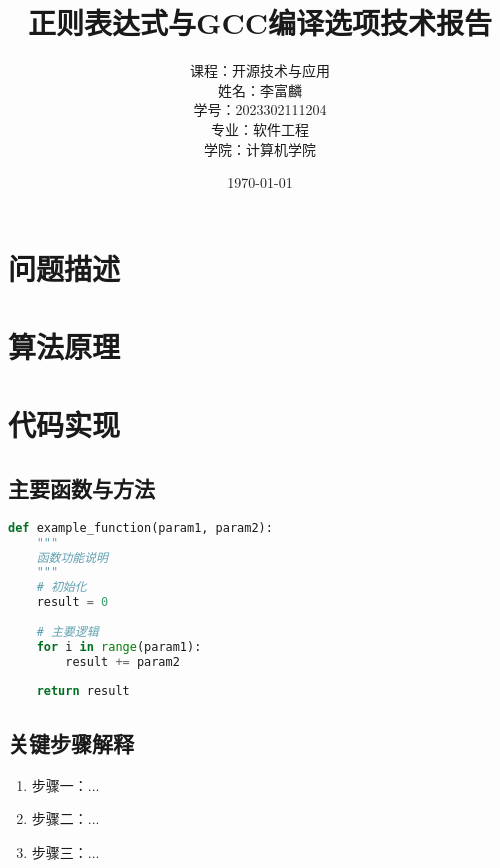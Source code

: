 \documentclass[letterpaper,12pt]{article}
\title{
    \textbf{正则表达式与GCC编译选项技术报告}
}
\author{
    \Large{课程：开源技术与应用} \\[0.5cm]
    \Large{姓名：李富麟} \\[0.3cm]
    \Large{学号：2023302111204} \\[0.3cm]
    \Large{专业：软件工程} \\[0.3cm]
    \Large{学院：计算机学院}
}
\date{\vspace{2cm}\today}
\begin{document}
\begin{titlepage}
\maketitle
\thispagestyle{empty}
\end{titlepage}

\newpage
\setcounter{page}{1}

\begin{abstract}
\end{abstract}

\section{问题描述}

\section{算法原理}

\section{代码实现}

\subsection{主要函数与方法}
\begin{lstlisting}[language=Python, caption=示例代码]
def example_function(param1, param2):
    """
    函数功能说明
    """
    # 初始化
    result = 0
    
    # 主要逻辑
    for i in range(param1):
        result += param2
        
    return result
\end{lstlisting}

\subsection{关键步骤解释}
\begin{enumerate}[label=\arabic*., leftmargin=*]
    \item 步骤一：...
    \item 步骤二：...
    \item 步骤三：...
\end{enumerate}
\end{document}
